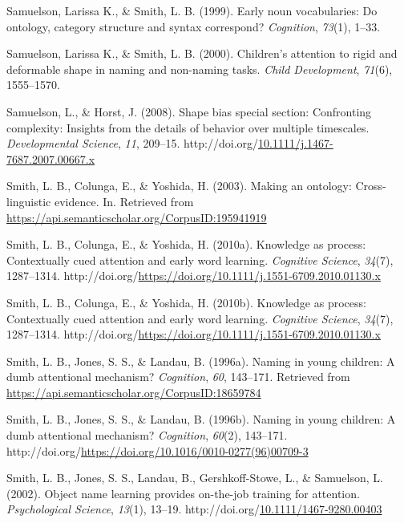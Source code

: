 \documentclass[10pt, letterpaper]{article}
\newenvironment{CSLReferences}%
  {}%
  {\par}
\begin{document}
\begin{CSLReferences}{1}{0}
\leavevmode{}%
Samuelson, Larissa K., \& Smith, L. B. (1999). Early noun vocabularies:
Do ontology, category structure and syntax correspond? \emph{Cognition},
\emph{73}(1), 1--33.

\leavevmode{}%
Samuelson, Larissa K., \& Smith, L. B. (2000). Children's attention to
rigid and deformable shape in naming and non-naming tasks. \emph{Child
Development}, \emph{71}(6), 1555--1570.

\leavevmode{}%
Samuelson, L., \& Horst, J. (2008). Shape bias special section:
Confronting complexity: Insights from the details of behavior over
multiple timescales. \emph{Developmental Science}, \emph{11}, 209--15.
http://doi.org/\href{https://doi.org/10.1111/j.1467-7687.2007.00667.x}{10.1111/j.1467-7687.2007.00667.x}

\leavevmode{}%
Smith, L. B., Colunga, E., \& Yoshida, H. (2003). Making an ontology:
Cross-linguistic evidence. In. Retrieved from
\url{https://api.semanticscholar.org/CorpusID:195941919}

\leavevmode{}%
Smith, L. B., Colunga, E., \& Yoshida, H. (2010a). Knowledge as process:
Contextually cued attention and early word learning. \emph{Cognitive
Science}, \emph{34}(7), 1287--1314.
http://doi.org/\url{https://doi.org/10.1111/j.1551-6709.2010.01130.x}

\leavevmode{}%
Smith, L. B., Colunga, E., \& Yoshida, H. (2010b). Knowledge as process:
Contextually cued attention and early word learning. \emph{Cognitive
Science}, \emph{34}(7), 1287--1314.
http://doi.org/\url{https://doi.org/10.1111/j.1551-6709.2010.01130.x}

\leavevmode{}%
Smith, L. B., Jones, S. S., \& Landau, B. (1996a). Naming in young
children: A dumb attentional mechanism? \emph{Cognition}, \emph{60},
143--171. Retrieved from
\url{https://api.semanticscholar.org/CorpusID:18659784}

\leavevmode{}%
Smith, L. B., Jones, S. S., \& Landau, B. (1996b). Naming in young
children: A dumb attentional mechanism? \emph{Cognition}, \emph{60}(2),
143--171.
http://doi.org/\url{https://doi.org/10.1016/0010-0277(96)00709-3}

\leavevmode{}%
Smith, L. B., Jones, S. S., Landau, B., Gershkoff-Stowe, L., \&
Samuelson, L. (2002). Object name learning provides on-the-job training
for attention. \emph{Psychological Science}, \emph{13}(1), 13--19.
http://doi.org/\href{https://doi.org/10.1111/1467-9280.00403}{10.1111/1467-9280.00403}


\end{CSLReferences}
\end{document}
